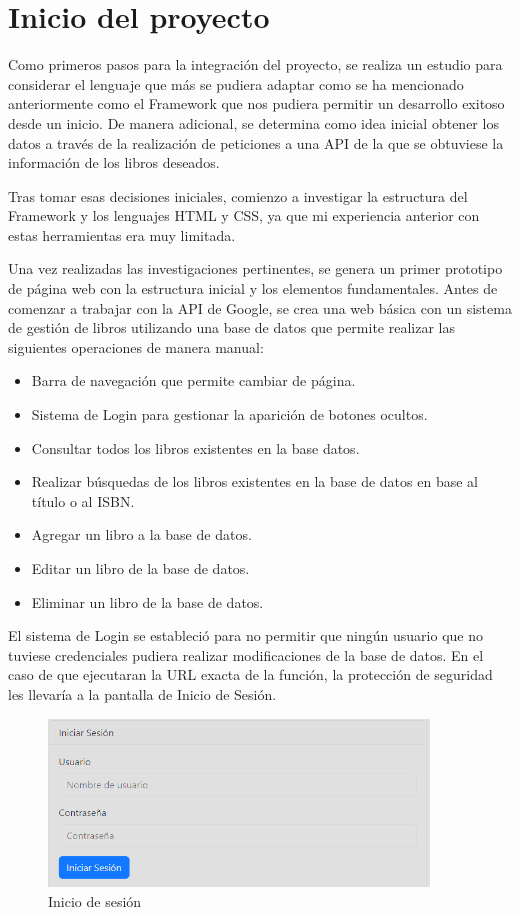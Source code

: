 \section{Inicio del proyecto}
Como primeros pasos para la integración del proyecto, se realiza un estudio para considerar el lenguaje que más se pudiera adaptar como se ha mencionado anteriormente como el Framework que nos pudiera permitir un desarrollo exitoso desde un inicio. De manera adicional, se determina como idea inicial obtener los datos a través de la realización de peticiones a una API de la que se obtuviese la información de los libros deseados.

Tras tomar esas decisiones iniciales, comienzo a investigar la estructura del Framework y los lenguajes HTML y CSS, ya que mi experiencia anterior con estas herramientas era muy limitada.

Una vez realizadas las investigaciones pertinentes, se genera un primer prototipo de página web con la estructura inicial y los elementos fundamentales. 
Antes de comenzar a trabajar con la API de Google, se crea una web básica con un sistema de gestión de libros utilizando una base de datos que permite realizar las siguientes operaciones de manera manual:

\begin{itemize}
    \item Barra de navegación que permite cambiar de página.
    \item Sistema de Login para gestionar la aparición de botones ocultos.
    \item Consultar todos los libros existentes en la base datos.
    \item Realizar búsquedas de los libros existentes en la base de datos en base al título o al ISBN.
    \item Agregar un libro a la base de datos.
    \item Editar un libro de la base de datos.
    \item Eliminar un libro de la base de datos.

\end{itemize}

El sistema de Login se estableció para no permitir que ningún usuario que no tuviese credenciales pudiera realizar modificaciones de la base de datos. En el caso de que ejecutaran la URL exacta de la función, la protección de seguridad les llevaría a la pantalla de Inicio de Sesión.

\begin{figure}[h]
    \centering
    \includegraphics[width=0.9\textwidth]{Imagenes/Inicio_Sesion.png}
    \caption{Inicio de sesión}
    \label{fig:Inicio de sesión}
\end{figure}



